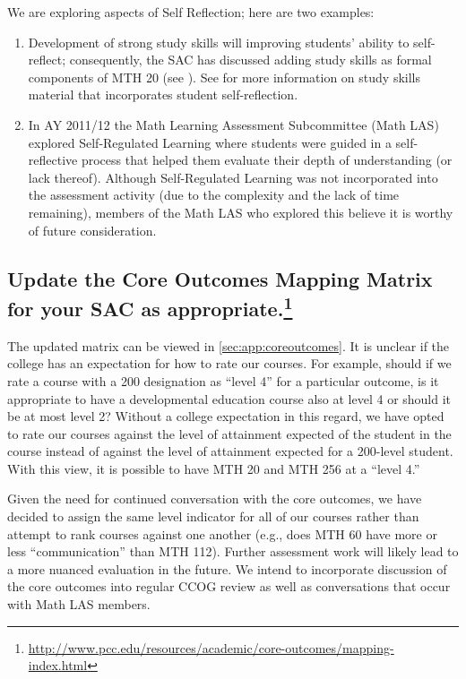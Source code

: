 \begin{description}
	We are exploring aspects of Self Reflection; here are two examples:
	\begin{enumerate}
		\item
		Development of strong study skills will improving students' ability to self-reflect; consequently,
		the SAC has discussed adding study skills as formal components
		of MTH 20 (see ).  See 
		for more information on study skills material that incorporates student
		self-reflection.
		\item
		In AY 2011/12 the Math Learning Assessment Subcommittee (Math LAS) explored
		Self-Regulated Learning where students were guided in a self-reflective
		process that helped them evaluate their depth of understanding (or lack
		thereof).  Although Self-Regulated Learning was not incorporated into the
		assessment activity (due to the complexity and the lack of time remaining),
		members of the Math LAS who explored this believe it is worthy of future
		consideration.
	\end{enumerate}
\end{description}

\subsection[Core outcomes mapping matrix]{Update the Core Outcomes Mapping Matrix for your SAC as
	appropriate.\footnote{\url{http://www.pcc.edu/resources/academic/core-outcomes/mapping-index.html}}}
The updated matrix can be viewed in \vref{sec:app:coreoutcomes}.
It is unclear if the college has an expectation for how to rate our courses.
For example, should if we rate a course with a 200 designation as ``level 4'' for
a particular outcome, is it appropriate to have a developmental education
course also at level 4 or should it be at most level 2? Without a college
expectation in this regard, we have opted to rate our courses against the level
of attainment expected of the student in the course instead of against the
level of attainment expected for a 200-level student. With this view, it is
possible to have MTH 20 and MTH 256 at a ``level 4.''

Given the need for continued conversation with the core outcomes, we have
decided to assign the same level indicator for all of our courses rather than
attempt to rank courses against one another (e.g., does MTH 60 have more or less
``communication'' than MTH 112). Further assessment work will likely lead to a
more nuanced evaluation in the future. We intend to incorporate discussion of
the core outcomes into regular CCOG review as well as conversations that occur
with Math LAS members.


